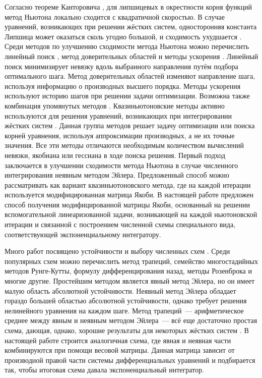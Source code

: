 Согласно теореме Канторовича \cite{kantorovich1949method,ortega2000iterative}, для липшицевых в окрестности корня функций метод Ньютона локально сходится с квадратичной скоростью.
В случае уравнений, возникающих при решении жёстких систем, односторонняя константа Липшица может оказаться сколь угодно большой, и сходимость ухудшается \cite{auzinger1990note, auzinger1993modern}.
Среди методов по улучшению сходимости метода Ньютона можно перечислить линейный поиск \cite{armijo1966minimization, wolfe1969convergence},
метод доверительных областей \cite{sorensen1982newton} и методы ускорения \cite{anderson1965iterative, nesterov27method, brown1994convergence}.
Линейный поиск минимизирует невязку вдоль выбранного направления путём подбора оптимального шага.
Метод доверительных областей изменяют направление шага, используя информацию о производных высшего порядка.
Методы ускорения используют историю шагов при решении задачи оптимизации.
Возможна также комбинация упомянутых методов \cite{brune2015composing}.
Квазиньютоновские методы активно используются для решения уравнений, возникающих при интегрировании жёстких систем
\cite{brown1985experiments, alexander1991modified, moore1994stepsize, schlenkrich2006application}.
Данная группа методов решает задачу оптимизации или поиска корней уравнения, используя аппроксимации производных, а не их точные значения.
Все эти методы отличаются необходимым количеством вычислений невязки, якобиана или гессиана в ходе поиска решения.
Первый подход заключается в улучшении сходимости метода Ньютона в случае численного интегрирования неявным методом Эйлера.
Предложенный способ можно рассматривать как вариант квазиньютоновского метода, где на каждой итерации используется модифицированная матрица Якоби.
В настоящей работе предложен способ получения модифицированной матрицы Якоби, основанный на решении вспомогательной линеаризованной задачи,
возникающей на каждой ньютоновской итерации и связанной с построением численной схемы специального вида,
соответствующей экспоненциальному интегратору.

Много работ посвящено устойчивости и выбору численных схем \cite{auzinger1993modern, dahlquist1963special, dahlquist1975stability, liu2019study}.
Среди популярных схем можно перечислить метод трапеций, семейство многостадийных методов Рунге-Кутты, формулу дифференцирования назад, методы Розенброка и многие другие.
Простейшим методом является явный метод Эйлера, но он имеет малую область абсолютной устойчивости.
Неявный метод Эйлера обладает гораздо большей областью абсолютной устойчивости, однако требует решения нелинейного уравнения на каждом шаге.
Метод трапеций~--- арифметическое среднее между явным и неявным методом Эйлера~--- всё еще достаточно простая схема,
дающая, однако, хорошие результаты для некоторых жёстких систем \cite{auzinger1989asymptotic}.
В настоящей работе строится аналогичная схема, где явная и неявная части комбинируются при помощи весовой матрицы.
Данная матрица зависит от производной правой части системы дифференциальных уравнений и подбирается так, чтобы итоговая схема давала экспоненциальный интегратор.

